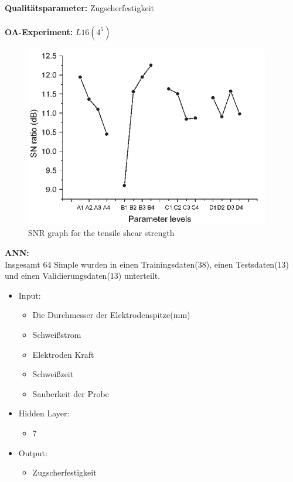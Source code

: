 \documentclass[english,ngerman]{tudscrreprt}
\begin{document}
\\
\textbf{Qualitätsparameter: }Zugscherfestigkeit\\
\\
\textbf{OA-Experiment: }$L16(4^{5})$\\
\begin{figure}[H]
\centering
\includegraphics[scale = 1]{./Bilder/SNR graph for the tensile shear strength.png}
\caption{SNR graph for the tensile shear strength}\label{fgg:T}
\end{figure}
\noindent
\textbf{ANN: }\\
Insgesamt 64 Simple wurden in einen Trainingsdaten(38), einen Testsdaten(13) und einen Validierungsdaten(13) unterteilt.
\begin{itemize}
\item Input:
\begin{itemize}
	\item Die Durchmesser der Elektrodenspitze(mm)
	\item Schweißstrom 
	\item Elektroden Kraft
	\item Schweißzeit
	\item Sauberkeit der Probe
\end{itemize}
\item Hidden Layer:
\begin{itemize}
	\item 7
\end{itemize}
\item Output:
\begin{itemize}
	\item Zugscherfestigkeit
\end{itemize}
\end{itemize}
\end{document}
